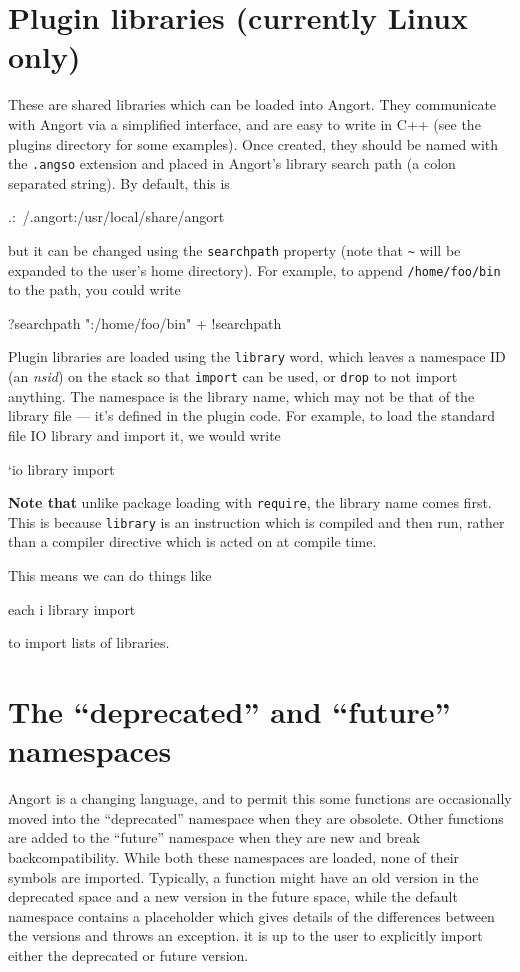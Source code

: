 \section{Plugin libraries (currently Linux only)}
\label{library}
These are shared libraries which can be loaded into Angort. They communicate
with Angort via a simplified interface, and are easy to write in C++ (see
the plugins directory for some examples). 
Once created, they should be named with the \texttt{.angso} extension
and placed in Angort's library search path (a colon separated string).
By default, this is 
\begin{v}
.:~/.angort:/usr/local/share/angort
\end{v}
but it can be changed using the 
\texttt{searchpath} property (note that \verb+~+ will be expanded
to the user's home directory). For example, to append \texttt{/home/foo/bin}
to the path, you could write
\begin{v}
?searchpath ":/home/foo/bin" + !searchpath
\end{v}
Plugin libraries are loaded using the \texttt{library} word, which
leaves a namespace ID (an \emph{nsid}) on the stack so that \texttt{import} can be
used, or \texttt{drop} to not import anything. The namespace is
the library name, which may not be that of the library file --- it's defined
in the plugin code. For example, to load the standard file IO library
and import it, we would write
\begin{v}
`io library import
\end{v}
\textbf{Note that} unlike package loading with \texttt{require},
the library name comes first.
This is because \texttt{library} is an instruction which is compiled and
then run, rather than a compiler directive which is acted on
at compile time.

This means we can do things like
\begin{v}
[`id3, `mpc, `io] each {i library import}
\end{v}
to import lists of libraries.

\section{The ``deprecated'' and ``future'' namespaces}
Angort is a changing language, and to permit this some functions are
occasionally moved into the ``deprecated'' namespace when they are obsolete.
Other functions are added to the ``future'' namespace when they are new
and break backcompatibility. 
While both these namespaces are loaded, none of their symbols are imported. 
Typically, a function might have an
old version in the deprecated space and a new version in the future space,
while the default namespace contains a placeholder which gives details
of the differences between the versions and throws an exception.
it is up to the user to explicitly import either the deprecated or
future version.

